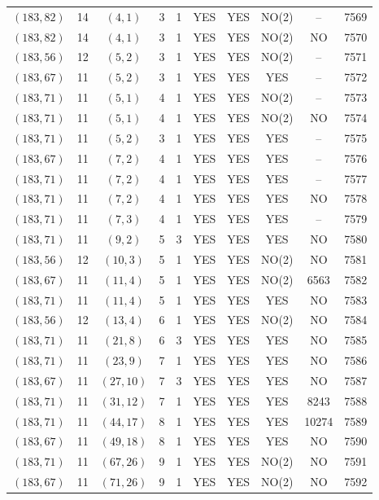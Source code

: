 \begin{longtable}{|c|c|c|c|c|c|c|c|c|c|}
$(183, 82)$ & 14 & $(4, 1)$ & 3 & 1 & YES & YES & NO(2) & -- & 7569\\
$(183, 82)$ & 14 & $(4, 1)$ & 3 & 1 & YES & YES & NO(2) & NO & 7570\\
$(183, 56)$ & 12 & $(5, 2)$ & 3 & 1 & YES & YES & NO(2) & -- & 7571\\
$(183, 67)$ & 11 & $(5, 2)$ & 3 & 1 & YES & YES & YES & -- & 7572\\
$(183, 71)$ & 11 & $(5, 1)$ & 4 & 1 & YES & YES & NO(2) & -- & 7573\\
$(183, 71)$ & 11 & $(5, 1)$ & 4 & 1 & YES & YES & NO(2) & NO & 7574\\
$(183, 71)$ & 11 & $(5, 2)$ & 3 & 1 & YES & YES & YES & -- & 7575\\
$(183, 67)$ & 11 & $(7, 2)$ & 4 & 1 & YES & YES & YES & -- & 7576\\
$(183, 71)$ & 11 & $(7, 2)$ & 4 & 1 & YES & YES & YES & -- & 7577\\
$(183, 71)$ & 11 & $(7, 2)$ & 4 & 1 & YES & YES & YES & NO & 7578\\
$(183, 71)$ & 11 & $(7, 3)$ & 4 & 1 & YES & YES & YES & -- & 7579\\
$(183, 71)$ & 11 & $(9, 2)$ & 5 & 3 & YES & YES & YES & NO & 7580\\
$(183, 56)$ & 12 & $(10, 3)$ & 5 & 1 & YES & YES & NO(2) & NO & 7581\\
$(183, 67)$ & 11 & $(11, 4)$ & 5 & 1 & YES & YES & NO(2) & 6563 & 7582\\
$(183, 71)$ & 11 & $(11, 4)$ & 5 & 1 & YES & YES & YES & NO & 7583\\
$(183, 56)$ & 12 & $(13, 4)$ & 6 & 1 & YES & YES & NO(2) & NO & 7584\\
$(183, 71)$ & 11 & $(21, 8)$ & 6 & 3 & YES & YES & YES & NO & 7585\\
$(183, 71)$ & 11 & $(23, 9)$ & 7 & 1 & YES & YES & YES & NO & 7586\\
$(183, 67)$ & 11 & $(27, 10)$ & 7 & 3 & YES & YES & YES & NO & 7587\\
$(183, 71)$ & 11 & $(31, 12)$ & 7 & 1 & YES & YES & YES & 8243 & 7588\\
$(183, 71)$ & 11 & $(44, 17)$ & 8 & 1 & YES & YES & YES & 10274 & 7589\\
$(183, 67)$ & 11 & $(49, 18)$ & 8 & 1 & YES & YES & YES & NO & 7590\\
$(183, 71)$ & 11 & $(67, 26)$ & 9 & 1 & YES & YES & NO(2) & NO & 7591\\
$(183, 67)$ & 11 & $(71, 26)$ & 9 & 1 & YES & YES & NO(2) & NO & 7592\\

\end{longtable}
